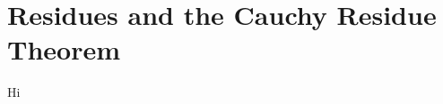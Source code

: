 \documentclass[10pt]{article}
\begin{document}
\section{Residues and the Cauchy Residue Theorem}
Hi \lipsum[2]
\end{document}
